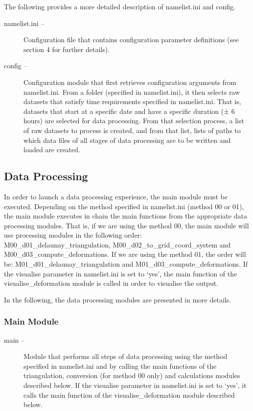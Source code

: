 \documentclass[draft]{agujournal2018}
\begin{document}
The following provides a more detailed description of namelist.ini and config.

\begin{description}

  \item[namelist.ini -- ]  Configuration file that contains configuration parameter definitions (see section 4 for further details).
    
    \item[config --] Configuration module that first retrieves configuration arguments from namelist.ini. From a folder (specified in namelist.ini), it then selects raw datasets that satisfy time requirements specified in namelist.ini. That is, datasets that start at a specific date and have a specific duration (± 6 hours) are selected for data processing. From that selection process, a list of raw datasets to process is created, and from that list, lists of paths to which data files of all stages of data processing are to be written and loaded are created.
\end{description}

\subsection{Data Processing}

In order to launch a data processing experience, the main module must be executed. Depending on the method specified in namelist.ini (method 00 or 01), the main module executes in chain the main functions from the appropriate data processing modules. That is, if we are using the method 00, the main module will use processing modules in the following order: M00\_d01\_delaunay\_triangulation, M00\_d02\_to\_grid\_coord\_system and M00\_d03\_compute\_deformations. If we are using the method 01, the order will be: M01\_d01\_delaunay\_triangulation and M01\_d03\_compute\_deformations. If the visualise parameter in namelist.ini is set to `yes', the main function of the visualise\_deformation module is called in order to visualise the output.

In the following, the data processing modules are presented in more details.

\subsubsection{Main Module}

\begin{description}
    \item[main -- ]
    Module that performs all steps of data processing using the method specified in namelist.ini and by calling the main functions of the triangulation, conversion (for method 00 only) and calculations modules described below. If the visualise parameter in namelist.ini is set to `yes', it calls the main function of the visualise\_deformation module described below.
\end{description}
\end{document}
